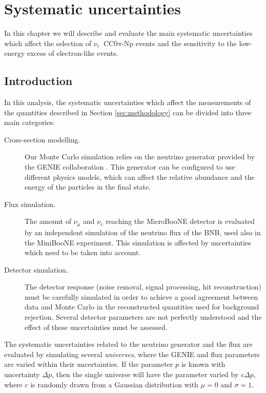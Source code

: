 \chapter{Systematic uncertainties}\label{sec:systematics}
\minitoc

In this chapter we will describe and evaluate the main systematic uncertainties which affect the selection of $\nu_e$~CC0$\pi$-Np events and the sensitivity to the low-energy excess of electron-like events.

\section{Introduction}
In this analysis, the systematic uncertainties which affect the measurements of the quantities described in Section \ref{sec:methodology} can be divided into three main categories: 
\begin{description}
\item[Cross-section modelling.] Our Monte Carlo simulation relies on the neutrino generator provided by the GENIE collaboration \cite{Andreopoulos:2009rq}. This generator can be configured to use different physics models, which can affect the relative abundance and the energy of the particles in the final state.
\item[Flux simulation.] The amount of $\nu_{\mu}$ and $\nu_{e}$ reaching the MicroBooNE detector is evaluated by an independent simulation of the neutrino flux of the BNB, used also in the MiniBooNE experiment. This simulation is affected by uncertainties which need to be taken into account.
\item[Detector simulation.] The detector response (noise removal, signal processing, hit reconstruction) must be carefully simulated in order to achieve a good agreement between data and Monte Carlo in the reconstructed quantities used for background rejection. Several detector parameters are not perfectly understood and the effect of these uncertainties must be assessed. 
\end{description}

The systematic uncertainties related to the neutrino generator and the flux are evaluated by simulating several \emph{universes}, where the GENIE and flux parameters are varied within their uncertainties. If the parameter $p$ is known with uncertainty $\Delta p$, then the single universe will have the parameter varied by $c\Delta p$, where $c$ is randomly drawn from a Gaussian distribution with $\mu=0$ and $\sigma=1$.

